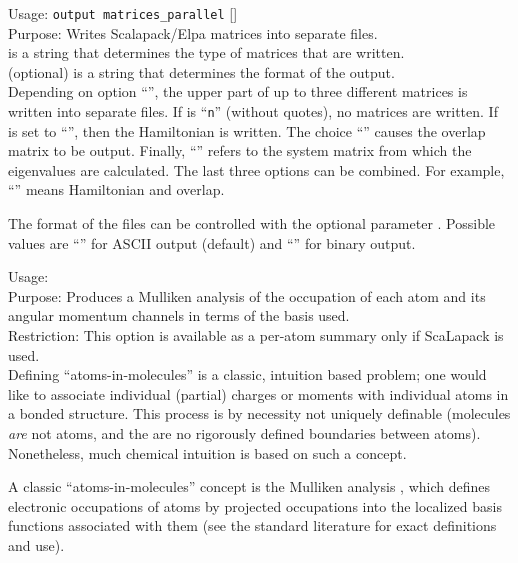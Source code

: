 {
  \noindent
  Usage: \texttt{output matrices\_parallel}  []
  \\[1.0ex]
  Purpose: Writes Scalapack/Elpa matrices into separate files.  \\[1.0ex]
   is a string that determines the type of matrices that are
  written.  \\[1.0ex]
   (optional) is a string that determines the format of the
  output.  \\
}
Depending on option ``'', the upper part of up to three different
matrices is written into separate files. If  is ``\texttt{n}''
(without quotes), no matrices are written. If  is set to
``'', then the Hamiltonian is written. The choice ``''
causes the overlap matrix to be output. Finally, ``'' refers to the
system matrix from which the eigenvalues are calculated. The last three options
can be combined. For example, ``'' means Hamiltonian and overlap.

The format of the files can be controlled with the optional parameter
. Possible values are ``'' for ASCII output (default)
and ``'' for binary output.


{
  \noindent
  Usage:   \\[1.0ex]
  Purpose: Produces a Mulliken analysis of the occupation of each atom
    and its angular momentum channels in terms of the basis
  used. \\[1.0ex]
  Restriction: This option is available as a per-atom summary only if
    ScaLapack is used. \\[1.0ex]
}
Defining ``atoms-in-molecules'' is a classic, intuition based problem;
one would like to associate individual (partial) charges or moments
with individual atoms in a bonded structure. This process is by
necessity not uniquely definable (molecules \emph{are} not atoms, and
the are no rigorously defined boundaries between atoms). Nonetheless,
much chemical intuition is based on such a concept. 

A classic ``atoms-in-molecules'' concept is the Mulliken analysis
\cite{Mulliken55}, which defines electronic occupations of atoms by
projected occupations into the localized basis functions associated
with them (see the standard literature for exact definitions and use). 

